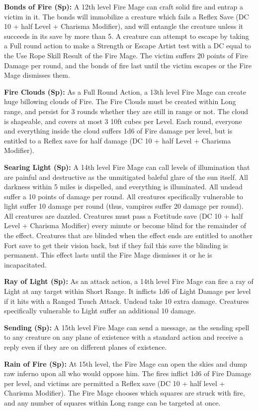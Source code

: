 \textbf{Bonds of Fire (Sp):} A 12th level Fire Mage can craft solid fire and entrap a victim in it. The bonds will immobilize a creature which fails a Reflex Save (DC 10 + half Level + Charisma Modifier), and will entangle the creature unless it succeeds in its save by more than 5. A creature can attempt to escape by taking a Full round action to make a Strength or Escape Artist test with a DC equal to the Use Rope Skill Result of the Fire Mage. The victim suffers 20 points of Fire Damage per round, and the bonds of fire last until the victim escapes or the Fire Mage dismisses them.

\textbf{Fire Clouds (Sp):} As a Full Round Action, a 13th level Fire Mage can create huge billowing clouds of Fire. The Fire Clouds must be created within Long range, and persist for 3 rounds whether they are still in range or not. The cloud is shapeable, and covers at most 3 10ft cubes per Level. Each round, everyone and everything inside the cloud suffers 1d6 of Fire damage per level, but is entitled to a Reflex save for half damage (DC 10 + half Level + Charisma Modifier).

\textbf{Searing Light (Sp):} A 14th level Fire Mage can call levels of illumination that are painful and destructive as the unmitigated baleful glare of the sun itself. All darkness within 5 miles is dispelled, and everything is illuminated. All undead suffer a 10 points of damage per round. All creatures specifically vulnerable to light suffer 10 damage per round (thus, vampires suffer 20 damage per round). All creatures are dazzled. Creatures must pass a Fortitude save (DC 10 + half Level + Charisma Modifier) every minute or become blind for the remainder of the effect. Creatures that are blinded when the effect ends are entitled to another Fort save to get their vision back, but if they fail this save the blinding is permanent. This effect lasts until the Fire Mage dismisses it or he is incapacitated.

\textbf{Ray of Light (Sp):} As an attack action, a 14th level Fire Mage can fire a ray of Light at any target within Short Range. It inflicts 1d6 of Light Damage per level if it hits with a Ranged Tuuch Attack. Undead take 10 extra damage. Creatures specifically vulnerable to Light suffer an additional 10 damage.

\textbf{Sending (Sp):} A 15th level Fire Mage can send a message, as the sending spell to any creature on any plane of existence with a standard action and receive a reply even if they are on different planes of existence.

\textbf{Rain of Fire (Sp):} At 15th level, the Fire Mage can open the skies and dump raw inferno upon all who would oppose him. The fires inflict 1d6 of Fire Damage per level, and victims are permitted a Reflex save (DC 10 + half level + Charisma Modifier). The Fire Mage chooses which squares are struck with fire, and any number of squares within Long range can be targeted at once.
